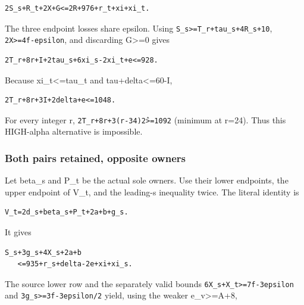 \documentclass[10pt,a4paper]{article}
\theoremstyle{definition}
\begin{document}
\begin{lstlisting}
2S_s+R_t+2X+G<=2R+976+r_t+xi+xi_t.
\end{lstlisting}

The three endpoint losses share epsilon. Using
\texttt{S\_\allowbreak{}\allowbreak{}s>=\allowbreak{}T\_\allowbreak{}\allowbreak{}r+\allowbreak{}tau\_\allowbreak{}\allowbreak{}s+\allowbreak{}4R\_\allowbreak{}\allowbreak{}s+\allowbreak{}10},\allowbreak{}
\texttt{2X>=\allowbreak{}4f-epsilon},\allowbreak{} and discarding G\textgreater=\allowbreak{}0
gives

\begin{lstlisting}
2T_r+8r+I+2tau_s+6xi_s-2xi_t+e<=928.
\end{lstlisting}

Because xi\_\allowbreak{}t\textless=\allowbreak{}tau\_\allowbreak{}t and tau+\allowbreak{}delta\textless=\allowbreak{}60-I,\allowbreak{}

\begin{lstlisting}
2T_r+8r+3I+2delta+e<=1048.
\end{lstlisting}

For every integer r,\allowbreak{} \texttt{2T\_\allowbreak{}\allowbreak{}r+\allowbreak{}8r+\allowbreak{}3(r-34)\^2>=\allowbreak{}1092}
(minimum at r=\allowbreak{}24). Thus this HIGH-alpha alternative is impossible.

\hypertarget{both-pairs-retained-opposite-owners}{%
\subsubsection{Both pairs retained,\allowbreak{} opposite
owners}\label{both-pairs-retained-opposite-owners}}

Let beta\_\allowbreak{}s and P\_\allowbreak{}t be the actual sole owners. Use their lower
endpoints,\allowbreak{} the upper endpoint of V\_\allowbreak{}t,\allowbreak{} and the leading-s inequality
twice. The literal identity is

\begin{lstlisting}
V_t=2d_s+beta_s+P_t+2a+b+g_s.
\end{lstlisting}

It gives

\begin{lstlisting}
S_s+3g_s+4X_s+2a+b
   <=935+r_s+delta-2e+xi+xi_s.
\end{lstlisting}

The source lower row and the separately valid bounds
\texttt{6X\_\allowbreak{}\allowbreak{}s+\allowbreak{}X\_\allowbreak{}\allowbreak{}t>=\allowbreak{}7f-3epsilon} and
\texttt{3g\_\allowbreak{}\allowbreak{}s>=\allowbreak{}3f-3epsilon/\allowbreak{}2} yield,\allowbreak{} using the weaker
e\_\allowbreak{}v\textgreater=\allowbreak{}A+\allowbreak{}8,\allowbreak{}
\end{document}

